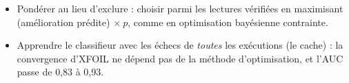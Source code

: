 \begin{pistes}
\begin{itemize}
\item Pondérer au lieu d'exclure : choisir parmi les lectures vérifiées en maximisant (amélioration prédite) $\times\ p$, comme en optimisation bayésienne contrainte.
\item Apprendre le classifieur avec les échecs de \emph{toutes} les exécutions (le cache) : la convergence d'XFOIL ne dépend pas de la méthode d'optimisation, et l'AUC passe de 0,83 à 0,93.
\end{itemize}
\end{pistes}
